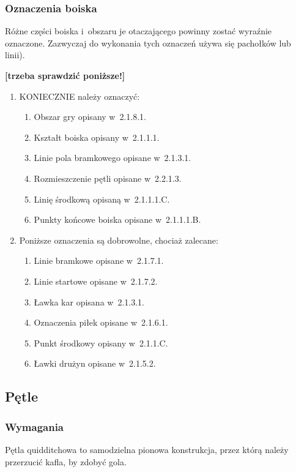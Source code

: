 \documentclass[12pt]{article}
\begin{document}
\subsubsection{Oznaczenia boiska}

Różne części boiska i~obszaru je otaczającego powinny zostać wyraźnie
oznaczone. Zazwyczaj do wykonania tych oznaczeń używa się pachołków lub
linii).

\textbf{[trzeba sprawdzić poniższe!]}

\begin{enumerate}
	\item
	      KONIECZNIE należy oznaczyć:

	      \begin{enumerate}
		      \item Obszar gry opisany w~2.1.8.1.
		      \item Kształt boiska opisany w~2.1.1.1.
		      \item Linie pola bramkowego opisane w~2.1.3.1.
		      \item Rozmieszczenie pętli opisane w~2.2.1.3.
		      \item Linię środkową opisaną w~2.1.1.1.C.
		      \item Punkty końcowe boiska opisane w~2.1.1.1.B.
	      \end{enumerate}

	\item Poniższe oznaczenia są dobrowolne, chociaż zalecane:
	      \begin{enumerate}
		      \item Linie bramkowe opisane w~2.1.7.1.
		      \item Linie startowe opisane w~2.1.7.2.
		      \item Ławka kar opisana w~2.1.3.1.
		      \item Oznaczenia piłek opisane w~2.1.6.1.
		      \item Punkt środkowy opisany w~2.1.1.C.
		      \item Ławki drużyn opisane w~2.1.5.2.
	      \end{enumerate}
\end{enumerate}

\subsection{Pętle}

\subsubsection{Wymagania}
Pętla quidditchowa to samodzielna pionowa
konstrukcja, przez którą należy przerzucić kafla, by zdobyć gola.
\end{document}
